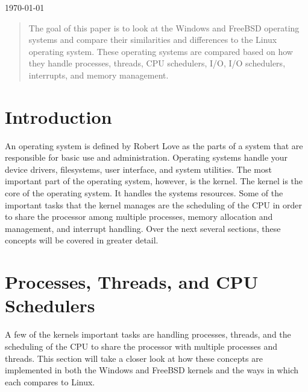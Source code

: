 \documentclass[journal,letterpaper,draftclsnofoot,onecolumn,10pt]{IEEEtran}
\begin{document}
\begin{titlepage}

{\large \today}\\[3cm] %

\begin{abstract}
The goal of this paper is to look at the Windows and FreeBSD operating systems and compare their similarities and differences to the Linux operating system. These operating systems are compared based on how they handle processes, threads, CPU schedulers, I/O, I/O schedulers, interrupts, and memory management.
\end{abstract}

\vfill %

\pagebreak

\end{titlepage}

\tableofcontents

\setlength{\parindent}{3ex}

\section{Introduction}

An operating system is defined by Robert Love as the parts of a system that are responsible for basic use and administration. Operating systems handle your device drivers, filesystems, user interface, and system utilities. The most important part of the operating system, however, is the kernel. The kernel is the core of the operating system. It handles the systems resources. Some of the important tasks that the kernel manages are the scheduling of the CPU in order to share the processor among multiple processes, memory allocation and management, and interrupt handling. Over the next several sections, these concepts will be covered in greater detail.    

\section{Processes, Threads, and CPU Schedulers}

A few of the kernels important tasks are handling processes, threads, and the scheduling of the CPU to share the processor with multiple processes and threads. This section will take a closer look at how these concepts are implemented in both the Windows and FreeBSD kernels and the ways in which each compares to Linux.
\end{document}
